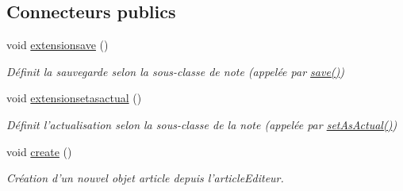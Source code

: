 \subsection*{Connecteurs publics}
\begin{DoxyCompactItemize}
\item 
\hypertarget{class_article_editeur_aa4898bacb77aeedde71e42e913fe2ef1}{void \hyperlink{class_article_editeur_aa4898bacb77aeedde71e42e913fe2ef1}{extensionsave} ()}\label{class_article_editeur_aa4898bacb77aeedde71e42e913fe2ef1}

\begin{DoxyCompactList}\small\item\em Définit la sauvegarde selon la sous-\/classe de note (appelée par \hyperlink{class_note_editeur_a605b1bca885c25460cb7d8863d1f3d03}{save()}) \end{DoxyCompactList}\item 
\hypertarget{class_article_editeur_ad7a90d03ed2b3b68821922d163572164}{void \hyperlink{class_article_editeur_ad7a90d03ed2b3b68821922d163572164}{extensionsetasactual} ()}\label{class_article_editeur_ad7a90d03ed2b3b68821922d163572164}

\begin{DoxyCompactList}\small\item\em Définit l'actualisation selon la sous-\/classe de la note (appelée par \hyperlink{class_note_editeur_a857f285628a0b7dcb6a69b18c977aa71}{set\-As\-Actual()}) \end{DoxyCompactList}\item 
\hypertarget{class_article_editeur_aeef410ab65c43484e0a39a71c65f7883}{void \hyperlink{class_article_editeur_aeef410ab65c43484e0a39a71c65f7883}{create} ()}\label{class_article_editeur_aeef410ab65c43484e0a39a71c65f7883}

\begin{DoxyCompactList}\small\item\em Création d'un nouvel objet article depuis l'article\-Editeur. \end{DoxyCompactList}\end{DoxyCompactItemize}
